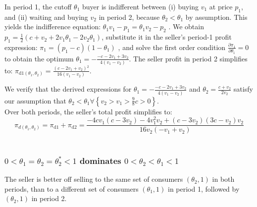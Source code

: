 \documentclass[isre,blindrev]{informs3} %
\begin{document}
In period 1, the cutoff \(\theta _1\) buyer is indifferent between (i) buying \(v_1\) at price \(p_1\), and (ii) waiting and buying \(v_2\) in period
2, because \(\theta _2<\theta _1\) by assumption. This { }yields the indifference equation: \(\theta _1v_1 - p_1 = \theta _1 v_2 - p_2\) . We obtain
\(p_1=\frac{1}{2} \left(c+v_2+2 v_1 \theta _1-2 v_2 \theta _1\right)\), substitute it in the seller{'}s period-1 profit expression: \(\pi _1=\left(p_1-c\right)\left(1-\theta
_1\right)\) , and solve the first order condition \(\frac{\partial \pi _1}{\partial \theta _1}=0\) to obtain the optimum \(\theta _1=-\frac{-c-2
v_1+3 v_2}{4 \left(v_1-v_2\right)}\). The seller profit in period 2 simplifies to: \(\pi _{\text{d1}\left(\theta _1,\theta _2\right)}=\frac{\left(c-2
v_1+v_2\right){}^2}{16 \left(v_1-v_2\right)}\).

We verify that the derived expressions for \(\theta _1=-\frac{-c-2 v_1+3 v_2}{4 \left(v_1-v_2\right)}\) and \(\theta _2=\frac{c+v_2}{2 v_2}\) satisfy
our assumption that \(\theta _2<\theta _1\forall \left\{v_2>v_1>\frac{9}{8}c>0\right\}\).
\qedsymbol\\

Over both periods, the seller{'}s total profit simplifies to: 
\begin{equation}\label{pi_d_th1_th2}
\pi _{d\left(\theta _1,\theta _2\right)}=\pi _{\text{d1}}+\pi _{\text{d2}}=\frac{-4 c v_1 \left(c-3 v_2\right)-4 v_1^2 v_2+\left(c-3 v_2\right) \left(3
c-v_2\right) v_2}{16 v_2 \left(-v_1+v_2\right)}
\end{equation}\\
\subsubsection{\(0<\theta _1=\theta _2=\theta _2^*<1\) dominates \(0<\theta _2<\theta _1<1\) }

\begin{lemma}
The seller is better off selling to the same set of consumers \(\left(\theta _2,1\right)\) in both periods, than to a different set of consumers
\(\left(\theta _1,1\right)\) in period 1, followed by \(\left(\theta _2,1\right)\) in period 2. 
\end{lemma}
\end{document}

